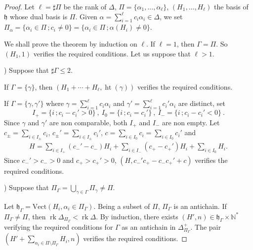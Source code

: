\documentclass[10pt,a4paper]{amsart}
\newcommand{\rank}{\mathop{\mathrm{rk}}\nolimits}
\newcommand{\height}{\mathop{\mathrm{ht}}\nolimits}
\numberwithin{equation}{section}
\theoremstyle{plain}
\theoremstyle{definition}
\theoremstyle{remark}
\begin{document}
\begin{proof}
Let $\ell = \sharp\Pi$ be the rank of $\Delta$, $\Pi = \{ \alpha_{1},\dots ,\alpha_{\ell}\}$,
$(H_{1},\dots ,H_{\ell})$ the basis of $\mathfrak{h}$ whose dual basis is $\Pi$.
Given $\alpha = \sum_{i=1}^{\ell} c_{i}\alpha_{i}\in\Delta$, we set 
$\Pi_{\alpha} = \{ \alpha_{i} \in \Pi \, ; c_{i}\neq 0 \} = \{\alpha_{i} \in \Pi  \, ; \alpha (H_{i}) \neq 0 \}$.
\smallskip

We shall prove the theorem by induction on $\ell$.
If $\ell = 1$, then $\Gamma = \Pi$. So 
$( H_{1}, 1)$ verifies the required conditions. 
Let us suppose that $\ell > 1$.

\smallskip
{}) Suppose that $\sharp \Gamma \leqslant 2$.
\smallskip

If $\Gamma = \{\gamma\}$, then
$(H_{1}+\cdots + H_{\ell}, \height( \gamma ) )$ verifies the required conditions.

If $\Gamma = \{\gamma ,\gamma'\}$ where
$\gamma = \sum_{i=1}^{\ell} c_{i}\alpha_{i}$ and $\gamma' = \sum_{i=1}^{\ell} c_{i}'\alpha_{i}$
are distinct, set 
$$
I_{+} = \{ i \, ; c_{i} -c_{i}' > 0 \} \ , \
I_{0} = \{ i \, ; c_{i}  = c_{i}' \} \ , \
I_{-} = \{ i \, ; c_{i} -c_{i}' < 0 \} \ .
$$
Since $\gamma$ and $\gamma'$ are non comparable, both $I_{+}$ and $I_{-}$ are non empty. 
Let $c_{\pm} = \sum_{i\in I_{\pm}} c_{i}$,
$c_{\pm}' = \sum_{i\in I_{\pm}} c_{i}'$, 
$c = \sum_{i\in I_{0}} c_{i} = \sum_{i\in I_{0}} c_{i}'$ and
$$\begin{array}{c}
H = \sum\limits_{i\in I_{+}} (c_{-}' -c_{-}) H_{i} +  \sum\limits_{i\in I_{-}} (c_{+}- c_{+}') 
H_{i} + \sum\limits_{i\in I_{0}} H_{i}.
\end{array}$$
Since $c_{-}' > c_{-} > 0$ and $c_{+} > c_{+}' > 0$, 
$(H , c_{-}'c_{+} - c_{-} c_{+}'+ c )$ verifies the required conditions. 

\smallskip
{}) Suppose that $\Pi_{\Gamma} = \bigcup_{\gamma\in \Gamma} \Pi_{\gamma} \neq \Pi$.
\smallskip

Let $\mathfrak{h}_{\Gamma}
= \mathrm{Vect}(H_{i} , \alpha_{i}\in\Pi_{\Gamma})$. Being a subset
of $\Pi$, $\Pi_{\Gamma}$ is an antichain. 
If $\Pi_{\Gamma} \neq \Pi$, then
$\rank \Delta_{\Pi_{\Gamma}} < \rank \Delta$. By induction, there exists 
$(H',n) \in \mathfrak{h}_{\Gamma} \times \mathbb{N}^{*}$ verifying the required conditions
for $\Gamma$ as an antichain in $\Delta_{\Pi_{\Gamma}}^{+}$. The pair 
$( H' + \sum_{\alpha_{i}\in \Pi \setminus \Pi_{\Gamma}} H_{i} , n)$
verifies the required conditions.


\end{proof}
\end{document}
